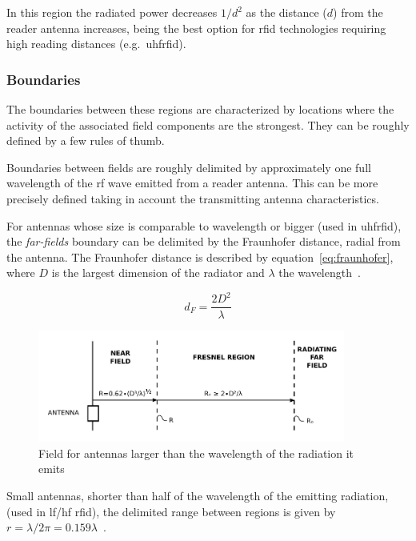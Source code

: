 In this region the radiated power decreases $1/d^2$ as the distance ($d$) from the reader antenna increases, being the best option for \ac{rfid} technologies requiring high reading distances (e.g.\ \ac{uhfrfid}).

\subsubsection{Boundaries}

The boundaries between these regions are characterized by locations where the activity of the associated field components are the strongest. They can be roughly defined by a few rules of thumb.

Boundaries between fields are roughly delimited by approximately one full wavelength of the \ac{rf} wave emitted from a reader antenna.
This can be more precisely defined taking in account the transmitting antenna characteristics.

For antennas whose size is comparable to wavelength or bigger (used in \ac{uhfrfid}), the \emph{far-fields} boundary can be delimited by the Fraunhofer distance, radial from the antenna. The Fraunhofer distance is described by equation~\ref{eq:fraunhofer}, where $D$ is the largest dimension of the radiator and $\lambda$ the wavelength~\cite{balanisAntennaTheoryAnalysis2005}.

\begin{equation} \label{eq:fraunhofer}
    d_F = \frac{2D^2}{\lambda}
\end{equation}

\begin{figure}[!ht]
    \centering
    \includegraphics[width=0.9\textwidth]{./figs/02-state-of-the-art/FarNearFields-USP-4998112.pdf}
    \caption{Field for antennas larger than the wavelength of the radiation it emits~\cite{zerodamageFarFieldsVectorized1991}} 
    \label{fig:fieldregionsbigantenna}
\end{figure}

Small antennas, shorter than half of the wavelength of the emitting radiation, (used in \ac{lf}/\ac{hf} \ac{rfid}), the delimited range between regions is given by $r = \lambda / 2\pi = 0.159\lambda$~\cite{nikitinOverviewFieldUHF2007a}. 

